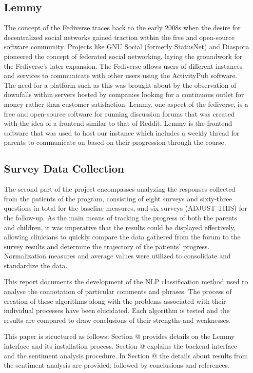 \documentclass[letterpaper, 12 pt, conference]{ieeeconf}
\makeatletter
\newcommand{\Rom}[1]{\expandafter\@slowromancap\romannumeral #1@}
\makeatother
\begin{document}
\subsection{Lemmy}
The concept of the Fediverse traces back to the early 2008s when the desire for decentralized social networks gained traction within the free and open-source software community. Projects like GNU Social (formerly StatusNet) and Diaspora pioneered the concept of federated social networking, laying the groundwork for the Fediverse's later expansion. The Fediverse allows users of different instances and services to communicate with other users using the ActivityPub software. The need for a platform such as this was brought about by the observation of downfalls within servers hosted by companies looking for a continuous outlet for money rather than customer satisfaction. Lemmy, one aspect of the fediverse, is a free and open-source software for running discussion forums that was created with the idea of a frontend similar to that of Reddit. Lemmy is the frontend software that was used to host our instance which includes a weekly thread for parents to communicate on based on their progression through the course. 

\subsection{Survey Data Collection}
The second part of the project encompasses analyzing the responses collected from the patients of the program, consisting of eight surveys and sixty-three questions in total for the baseline measures, and six surveys (ADJUST THIS) for the follow-up. As the main means of tracking the progress of both the parents and children, it was imperative that the results could be displayed effectively, allowing clinicians to quickly compare the data gathered from the forum to the survey results and determine the trajectory of the patients' progress. Normalization measures and average values were utilized to consolidate and standardize the data. 

This report documents the development of the NLP classification method used to analyse the connotation of particular comments and phrases. The process of creation of these algorithms along with the problems associated with their individual processes have been elucidated. Each algorithm is tested and the results are compared to draw conclusions of their strengths and weaknesses.   

This paper is structured as follows: Section \Rom{2} provides details on the Lemmy interface and its installation process. Section \Rom{3} explains the backend interface and the sentiment analysis procedure. In Section \Rom{4} the details about results from the sentiment analysis are provided; followed by conclusions and references.
\end{document}
